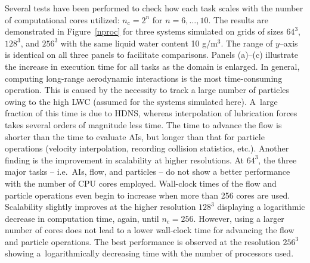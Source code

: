 \documentclass[../thesis.tex]{subfiles}
\begin{document}
Several tests have been performed to check how each task scales with the number of computational cores utilized: $n_\text{c}=2^n$ for $n=6,\dots,10$. The results are demonstrated in Figure~\ref{nproc} for three systems simulated on grids of sizes $64^3$, $128^3$, and $256^3$ with the same liquid water content 10 g/m$^3$. The range of \mbox{$y$--axis} is identical on all three panels to facilitate comparisons. Panels (a)--(c) illustrate the increase in execution time for all tasks as the domain is enlarged. In general, computing long-range aerodynamic interactions is the most time-consuming operation. This is caused by the necessity to track a large number of particles owing to the high LWC (assumed for the systems simulated here). A~large fraction of this time is due to HDNS, whereas interpolation of lubrication forces takes several orders of magnitude less time. The time to advance the flow is shorter than the time to evaluate AIs, but longer than that for particle operations (velocity interpolation, recording collision statistics, etc.). Another finding is the improvement in scalability at higher resolutions. At $64^3$, the three major tasks -- i.e.~AIs, flow, and particles -- do not show a better performance with the number of CPU cores employed. Wall-clock times of the flow and particle operations even begin to increase when more than 256 cores are used. Scalability slightly improves at the higher resolution $128^3$ displaying a logarithmic decrease in computation time, again, until $n_\text{c}=256$. However, using a larger number of cores does not lead to a lower wall-clock time for advancing the flow and particle operations. The best performance is observed at the resolution $256^3$ showing a~logarithmically decreasing time with the number of processors used.
\end{document}
